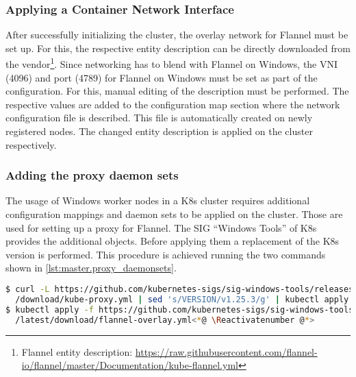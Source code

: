 \subsubsection{Applying a Container Network Interface}
After successfully initializing the cluster, the overlay network for Flannel must be set up.
For this, the respective entity description can be directly downloaded from the vendor\footnote{Flannel entity description: \href{https://raw.githubusercontent.com/flannel-io/flannel/master/Documentation/kube-flannel.yml}{https://raw.githubusercontent.com/flannel-io/flannel/master/Documentation/kube-flannel.yml}}. Since networking has to blend with Flannel on \ac{Windows}, the \ac{VNI} (4096) and port (4789) for Flannel on \ac{Windows} must be set as part of the configuration. For this, manual editing of the description must be performed. The respective values are added to the configuration map section where the network configuration file is described. This file is automatically created on newly registered nodes. The changed entity description is applied on the cluster respectively.



\subsubsection{Adding the proxy daemon sets}
The usage of \ac{Windows} worker nodes in a \ac{K8s} cluster requires additional configuration mappings and daemon sets to be applied on the cluster. Those are used for setting up a proxy for Flannel. The \ac{SIG} \enquote{Windows Tools} of \ac{K8s} provides the additional objects\cite{GitHubKubernetesSIGWindowsTools.20230213}. Before applying them a replacement of the \ac{K8s} version is performed. This procedure is achieved running the two commands shown in \autoref{lst:master.proxy_daemonsets}. 
\begin{lstlisting}[label=lst:master.proxy_daemonsets, caption={Bash command for adding the flannel overlay configuration\cite{GitHubKubernetesSIGWindowsTools.20230213}}, language=bash]
$ curl -L https://github.com/kubernetes-sigs/sig-windows-tools/releases/latest \<*@ \Suppressnumber @*>
  /download/kube-proxy.yml | sed 's/VERSION/v1.25.3/g' | kubectl apply -f -<*@ \Reactivatenumber @*>
$ kubectl apply -f https://github.com/kubernetes-sigs/sig-windows-tools/releases \<*@ \Suppressnumber @*>
  /latest/download/flannel-overlay.yml<*@ \Reactivatenumber @*>
\end{lstlisting}


